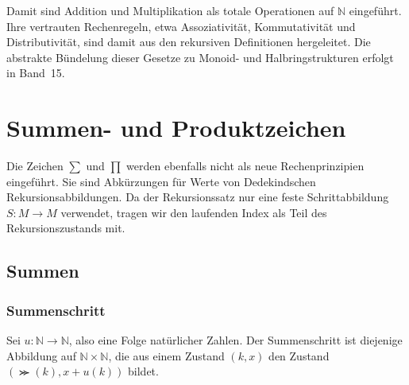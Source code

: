 \documentclass[main.tex]{subfiles}
\begin{document}
Damit sind Addition und Multiplikation als totale Operationen auf
\(\mathbb{N}\) eingeführt. Ihre vertrauten Rechenregeln, etwa Assoziativität,
Kommutativität und Distributivität, sind damit aus den rekursiven Definitionen
hergeleitet. Die abstrakte Bündelung dieser Gesetze zu Monoid- und
Halbringstrukturen erfolgt in Band~15.

\section{Summen- und Produktzeichen}

Die Zeichen \(\sum\) und \(\prod\) werden ebenfalls nicht als neue
Rechenprinzipien eingeführt. Sie sind Abkürzungen für Werte von
Dedekindschen Rekursionsabbildungen. Da der Rekursionssatz nur eine feste
Schrittabbildung \(S\colon M\to M\) verwendet, tragen wir den laufenden Index
als Teil des Rekursionszustands mit.

\subsection{Summen}

\subsubsection{Summenschritt}

Sei \(u\colon\mathbb{N}\to\mathbb{N}\), also eine Folge natürlicher Zahlen.
Der Summenschritt ist diejenige Abbildung auf
\(\mathbb{N}\times\mathbb{N}\), die aus einem Zustand \((k,x)\) den Zustand
\((\Succ(k),x + u(k))\) bildet.


\begin{tabproof}
\end{tabproof}
\end{document}
